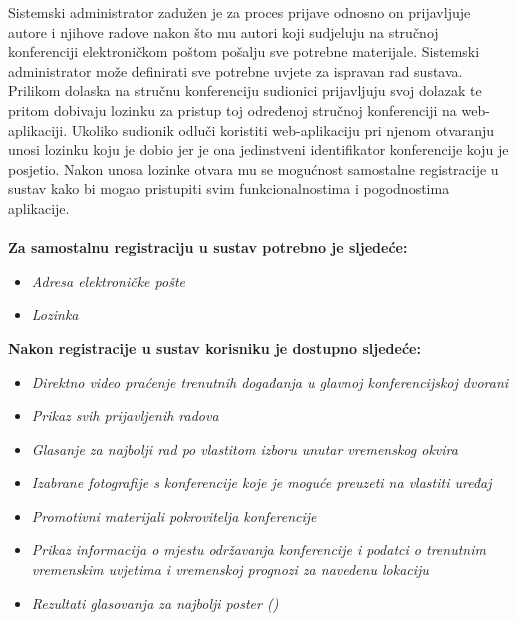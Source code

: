         Sistemski administrator zadužen je za proces prijave odnosno on prijavljuje autore i njihove radove nakon što mu autori koji sudjeluju na stručnoj konferenciji elektroničkom poštom pošalju sve potrebne materijale. Sistemski administrator može definirati sve potrebne uvjete za ispravan rad sustava.\\

        Prilikom dolaska na stručnu konferenciju sudionici prijavljuju svoj dolazak te pritom dobivaju lozinku za pristup toj određenoj stručnoj konferenciji na web-aplikaciji. Ukoliko sudionik odluči koristiti web-aplikaciju pri njenom otvaranju unosi lozinku koju je dobio jer je ona jedinstveni identifikator konferencije koju je posjetio. Nakon unosa lozinke otvara mu se mogućnost samostalne registracije u sustav kako bi mogao pristupiti svim funkcionalnostima i pogodnostima aplikacije.\\\\

        \textbf{Za samostalnu registraciju u sustav potrebno je sljedeće:}
        \begin{itemize}
            \item \textit{Adresa elektroničke pošte}
            \item \textit{Lozinka}
        \end{itemize}

        \textbf{Nakon registracije u sustav korisniku je dostupno sljedeće:}
        \begin{itemize}
            \item \textit{Direktno video praćenje trenutnih događanja u glavnoj konferencijskoj dvorani}
            \item \textit{Prikaz svih prijavljenih radova}
            \item \textit{Glasanje za najbolji rad po vlastitom izboru unutar vremenskog okvira}
            \item \textit{Izabrane fotografije s konferencije koje je moguće preuzeti na vlastiti uređaj}
            \item \textit{Promotivni materijali pokrovitelja konferencije}
            \item \textit{Prikaz informacija o mjestu održavanja konferencije i podatci o trenutnim vremenskim uvjetima i vremenskoj prognozi za navedenu lokaciju}
            \item \textit{Rezultati glasovanja za najbolji poster ()}
        \end{itemize}

